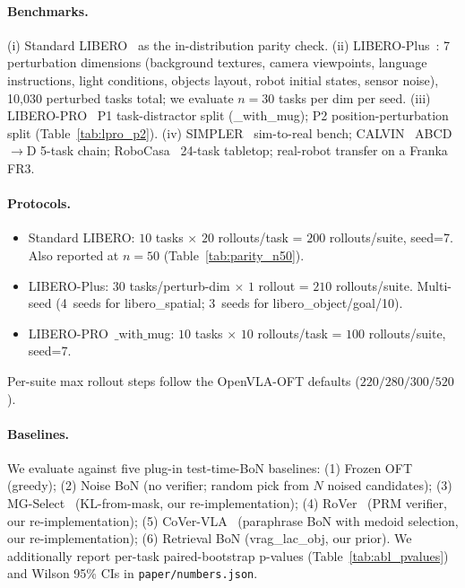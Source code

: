 \documentclass{article}
\begin{document}
\paragraph{Benchmarks.}
(i) Standard LIBERO~\citep{liu2023libero} as the in-distribution
parity check.
(ii) LIBERO-Plus~\citep{libero_plus2025}: 7 perturbation dimensions
(background textures, camera viewpoints, language instructions, light
conditions, objects layout, robot initial states, sensor noise),
10{,}030 perturbed tasks total; we evaluate $n=30$ tasks per dim per
seed.
(iii) LIBERO-PRO~\citep{libero_pro2025} P1 task-distractor split
(\_with\_mug); P2 position-perturbation split (Table~\ref{tab:lpro_p2}).
(iv) SIMPLER~\citep{simpler2024} sim-to-real bench;
CALVIN~\citep{calvin2022} ABCD$\to$D 5-task chain;
RoboCasa~\citep{robocasa2024} 24-task tabletop; real-robot transfer
on a Franka FR3.

\paragraph{Protocols.}
\begin{itemize}[topsep=0pt,itemsep=2pt,leftmargin=*]
\item Standard LIBERO: $10$ tasks $\times$ $20$ rollouts/task =
      $200$ rollouts/suite, seed=7. Also reported at $n{=}50$
      (Table~\ref{tab:parity_n50}).
\item LIBERO-Plus: $30$ tasks/perturb-dim $\times$ $1$ rollout =
      $210$ rollouts/suite. Multi-seed (4~seeds for libero\_spatial;
      3~seeds for libero\_object/goal/10).
\item LIBERO-PRO~$\_$with$\_$mug: $10$ tasks $\times$ $10$
      rollouts/task = $100$ rollouts/suite, seed=7.
\end{itemize}
Per-suite max rollout steps follow the OpenVLA-OFT defaults
($220 / 280 / 300 / 520$).

\paragraph{Baselines.}
We evaluate against five plug-in test-time-BoN baselines:
(1) Frozen OFT (greedy);
(2) Noise BoN (no verifier; random pick from $N$ noised candidates);
(3) MG-Select~\citep{mgselect2026} (KL-from-mask, our re-implementation);
(4) RoVer~\citep{rover2026} (PRM verifier, our re-implementation);
(5) CoVer-VLA~\citep{cover_vla2025} (paraphrase BoN with medoid
    selection, our re-implementation);
(6) Retrieval BoN (vrag\_lac\_obj, our prior).
We additionally report per-task paired-bootstrap p-values
(Table~\ref{tab:abl_pvalues}) and Wilson 95\% CIs in
\texttt{paper/numbers.json}.
\end{document}
